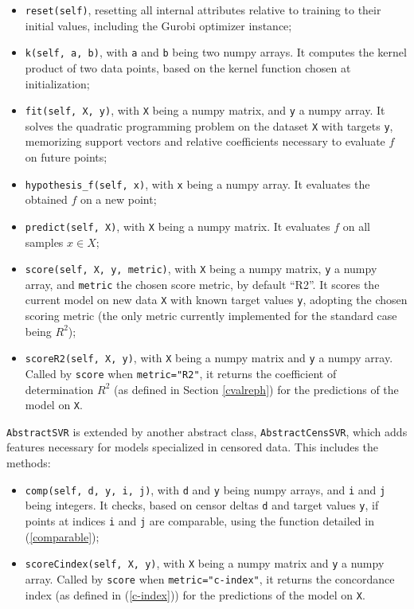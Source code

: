 \documentclass[12pt]{report}
\begin{document}
\begin{itemize}
\item \texttt{reset(self)}, resetting all internal attributes relative to training to their initial values, including the Gurobi optimizer instance;
\item \texttt{k(self, a, b)}, with \texttt{a} and \texttt{b} being two numpy arrays. It computes the kernel product of two data points, based on the kernel function chosen at initialization;
\item \texttt{fit(self, X, y)}, with \texttt{X} being a numpy matrix, and \texttt{y} a numpy array. It solves the quadratic programming problem on the dataset \texttt{X} with targets \texttt{y}, memorizing support vectors and relative coefficients necessary to evaluate $f$ on future points;
\item \texttt{hypothesis\_f(self, x)}, with \texttt{x} being a numpy array. It evaluates the obtained $f$ on a new point;
\item \texttt{predict(self, X)}, with \texttt{X} being a numpy matrix. It evaluates $f$ on all samples $x \in X$;
\item \texttt{score(self, X, y, metric)}, with \texttt{X} being a numpy matrix, \texttt{y} a numpy array, and \texttt{metric} the chosen score metric, by default ``R2''. It scores the current model on new data \texttt{X} with known target values \texttt{y}, adopting the chosen scoring metric (the only metric currently implemented for the standard case being $R^2$);
\item \texttt{scoreR2(self, X, y)}, with \texttt{X} being a numpy matrix and \texttt{y} a numpy array. Called by \texttt{score} when \texttt{metric="R2"}, it returns the coefficient of determination $R^2$ (as defined in Section \ref{cvalreph}) for the predictions of the model on \texttt{X}.
\end{itemize}
\texttt{AbstractSVR} is extended by another abstract class, \texttt{AbstractCensSVR}, which adds features necessary for models specialized in censored data. This includes the methods:
\begin{itemize}
\item \texttt{comp(self, d, y, i, j)}, with \texttt{d} and \texttt{y} being numpy arrays, and \texttt{i} and \texttt{j} being integers. It checks, based on censor deltas \texttt{d} and target values \texttt{y}, if points at indices \texttt{i} and \texttt{j} are comparable, using the function detailed in (\ref{comparable});
\item \texttt{scoreCindex(self, X, y)}, with \texttt{X} being a numpy matrix and \texttt{y} a numpy array. Called by \texttt{score} when \texttt{metric="c-index"}, it returns the concordance index (as defined in (\ref{c-index})) for the predictions of the model on \texttt{X}.
\end{itemize}
\end{document}
